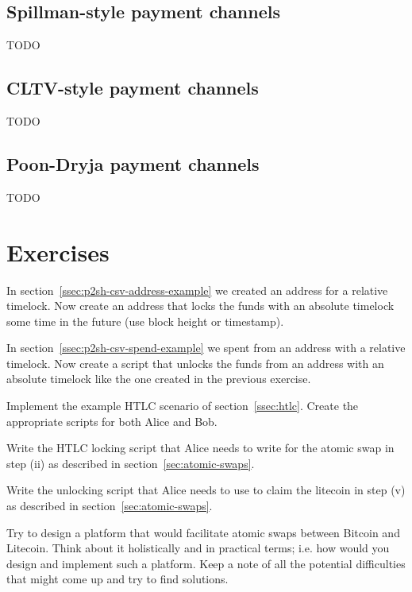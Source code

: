 \subsection*{Spillman-style payment channels}
TODO


\subsection*{CLTV-style payment channels}
TODO


\subsection*{Poon-Dryja payment channels}
TODO




\section{Exercises}

\begin{exercise}
In section~\ref{ssec:p2sh-csv-address-example} we created an address for a relative timelock. Now create an address that locks the funds with an absolute timelock some time in the future (use block height or timestamp).
\end{exercise}

\begin{exercise}
In section~\ref{ssec:p2sh-csv-spend-example} we spent from an address with a relative timelock. Now create a script that unlocks the funds from an address with an absolute timelock like the one created in the previous exercise.
\end{exercise}

\begin{exercise}
Implement the example HTLC scenario of section~\ref{ssec:htlc}. Create the appropriate scripts for both Alice and Bob.
\end{exercise}

\begin{exercise}
Write the HTLC locking script that Alice needs to write for the atomic swap in step (ii) as described in section~\ref{sec:atomic-swaps}. 
\end{exercise}

\begin{exercise}
Write the unlocking script that Alice needs to use to claim the litecoin in step (v) as described in section~\ref{sec:atomic-swaps}. 
\end{exercise}

\begin{exercise}
Try to design a platform that would facilitate atomic swaps between Bitcoin and Litecoin. Think about it holistically and in practical terms; i.e. how would you design and implement such a platform. Keep a note of all the potential difficulties that might come up and try to find solutions.
\end{exercise}



